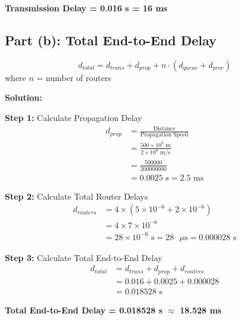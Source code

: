 \documentclass[12pt,a4paper]{article}
\begin{document}
\begin{answerbox}
\textbf{Transmission Delay = 0.016 s = 16 ms}
\end{answerbox}

\subsection{Part (b): Total End-to-End Delay}

\begin{formulabox}
\[d_{total} = d_{trans} + d_{prop} + n \cdot (d_{queue} + d_{proc})\]
where $n$ = number of routers
\end{formulabox}

\textbf{Solution:}

\textbf{Step 1:} Calculate Propagation Delay
\begin{align*}
d_{prop} &= \frac{\text{Distance}}{\text{Propagation Speed}} \\[1em]
&= \frac{500 \times 10^3 \text{ m}}{2 \times 10^8 \text{ m/s}} \\[1em]
&= \frac{500000}{200000000} \\[1em]
&= 0.0025 \text{ s} = 2.5 \text{ ms}
\end{align*}

\textbf{Step 2:} Calculate Total Router Delays
\begin{align*}
d_{routers} &= 4 \times (5 \times 10^{-6} + 2 \times 10^{-6}) \\[1em]
&= 4 \times 7 \times 10^{-6} \\[1em]
&= 28 \times 10^{-6} \text{ s} = 28 \text{ } \mu\text{s} = 0.000028 \text{ s}
\end{align*}

\textbf{Step 3:} Calculate Total End-to-End Delay
\begin{align*}
d_{total} &= d_{trans} + d_{prop} + d_{routers} \\[1em]
&= 0.016 + 0.0025 + 0.000028 \\[1em]
&= 0.018528 \text{ s}
\end{align*}

\begin{answerbox}
\textbf{Total End-to-End Delay = 0.018528 s $\approx$ 18.528 ms}
\end{answerbox}

\end{document}
